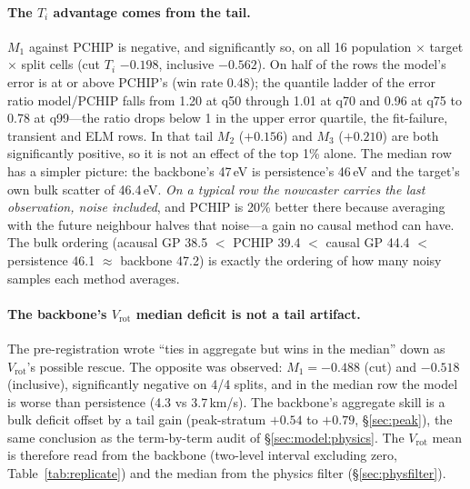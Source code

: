 \documentclass[10pt]{article}
\newcommand{\Ti}{\ensuremath{T_i}}
\newcommand{\Vrot}{\ensuremath{V_\mathrm{rot}}}
\begin{document}
\paragraph{The \Ti{} advantage comes from the tail.} $M_1$ against PCHIP is negative,
and significantly so, on all 16 population $\times$ target $\times$ split cells (cut
\Ti{} $-0.198$, inclusive $-0.562$). On half of the rows the model's error is at or above PCHIP's (win rate
0.48); the quantile ladder of the error ratio model/PCHIP falls from 1.20 at q50
through 1.01 at q70 and 0.96 at q75 to 0.78 at q99---the ratio drops below 1 in the upper
error quartile, the fit-failure, transient and ELM rows. In that tail $M_2$
($+0.156$) and $M_3$ ($+0.210$) are both significantly positive, so it is not an
effect of the top 1\% alone. The median row has a simpler picture: the backbone's
47\,eV is persistence's 46\,eV and the target's own bulk scatter of 46.4\,eV.
\emph{On a typical row the nowcaster carries the last observation, noise included},
and PCHIP is 20\% better there because averaging with the future neighbour halves
that noise---a gain no causal method can have. The bulk ordering (acausal GP 38.5
$<$ PCHIP 39.4 $<$ causal GP 44.4 $<$ persistence 46.1 $\approx$ backbone 47.2) is
exactly the ordering of how many noisy samples each method averages.

\paragraph{The backbone's \Vrot{} median deficit is not a tail artifact.} The pre-registration wrote
``ties in aggregate but wins in the median'' down as \Vrot{}'s possible rescue. The
opposite was observed: $M_1 = -0.488$ (cut) and $-0.518$ (inclusive), significantly
negative on 4/4 splits, and in the median row the model is worse than persistence
(4.3 vs 3.7\,km/s). The backbone's aggregate skill is a bulk deficit offset by a
tail gain (peak-stratum $+0.54$ to $+0.79$, \S\ref{sec:peak}), the same conclusion as
the term-by-term audit of \S\ref{sec:model:physics}. The \Vrot{} mean is therefore read from
the backbone (two-level interval excluding zero, Table~\ref{tab:replicate}) and the
median from the physics filter (\S\ref{sec:physfilter}).
\end{document}
